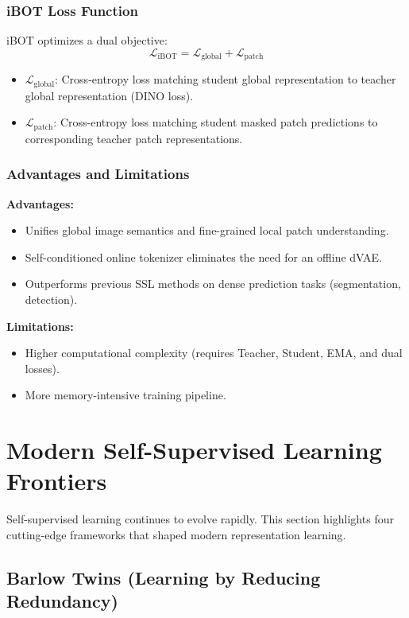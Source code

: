 \subsubsection{iBOT Loss Function}

iBOT optimizes a dual objective:
\[
\mathcal{L}_{\text{iBOT}} = \mathcal{L}_{\text{global}} + \mathcal{L}_{\text{patch}}
\]
\begin{itemize}
    \item $\mathcal{L}_{\text{global}}$: Cross-entropy loss matching student global representation to teacher global representation (DINO loss).
    \item $\mathcal{L}_{\text{patch}}$: Cross-entropy loss matching student masked patch predictions to corresponding teacher patch representations.
\end{itemize}

\subsubsection{Advantages and Limitations}
\textbf{Advantages:}
\begin{itemize}
    \item Unifies global image semantics and fine-grained local patch understanding.
    \item Self-conditioned online tokenizer eliminates the need for an offline dVAE.
    \item Outperforms previous SSL methods on dense prediction tasks (segmentation, detection).
\end{itemize}

\textbf{Limitations:}
\begin{itemize}
    \item Higher computational complexity (requires Teacher, Student, EMA, and dual losses).
    \item More memory-intensive training pipeline.
\end{itemize}


\section{Modern Self-Supervised Learning Frontiers}

Self-supervised learning continues to evolve rapidly. This section highlights four cutting-edge frameworks that shaped modern representation learning.

\subsection{Barlow Twins (Learning by Reducing Redundancy)}

